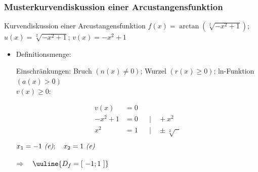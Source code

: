 
\subsubsection{Musterkurvendiskussion einer Arcustangensfunktion}

\begin{Example}{Kurvendiskussion einer Arcustangensfunktion}{}
$f(x) = \arctan\left(\sqrt[2]{-x^{2} +1}\right)$; \qquad $u(x) = \sqrt[2]{-x^{2} +1}$; \qquad $v(x) = -x^{2} +1$
\begin{itemize}
    \item Definitionsmenge: \\{
        Einschränkungen: \qquad Bruch $\left(n(x) \neq 0\right)$; Wurzel $\left(r(x) \geq 0\right)$; ln-Funktion $\left(a(x) > 0\right)$\\[1.0ex]
        $v(x) \geq 0:$\\[-2.0ex]
        \begin{minipage}[t]{0.35\linewidth}
            \vspace{-2.0ex}
            \begin{align*}
                v(x) &= 0 &&\\[2.0ex]
                -x^{2} + 1 &= 0 &&| \quad + x^{2}\\[1.5ex]
                x^{2} &=  1 &&| \quad \pm \sqrt[2]{\phantom{x}}\\[-2.0ex]
            \end{align*}
            $x_{1} = -1 \ \text{\textit{(e)}}; \quad x_{2} = 1 \ \text{\textit{(e)}}$\\
        \end{minipage}
        \hfill
        \begin{minipage}[t]{0.60\linewidth}
        \end{minipage}
        $\Rightarrow \quad \uuline{D_{f} = \left[ \ -1; 1 \ \right]}$
}
\end{itemize}
\end{Example}
